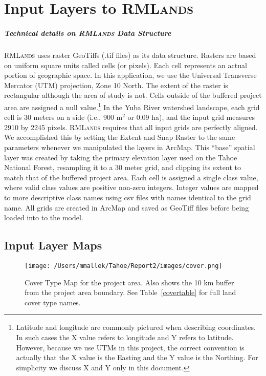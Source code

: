 \appendix


\chapter{Input Layers to \textsc{RMLands}}
\label{app:inputs}

\paragraph{Technical details on \textsc{RMLands} Data Structure}
\label{app:rmlspecs}
\textsc{RMLands} uses raster GeoTiffs (.tif files) as its data structure. Rasters are based on uniform square units called cells (or pixels). Each cell represents an actual portion of geographic space. In this application, we use the Universal Transverse Mercator (UTM) projection, Zone 10 North. The extent of the raster is rectangular although the area of study is not. Cells outside of the buffered project area are assigned a null value.\footnote{Latitude and longitude are commonly pictured when describing coordinates. In such cases the X value refers to longitude and Y refers to latitude. However, because we use UTMs in this project, the correct convention is actually that the X value is the Easting and the Y value is the Northing. For simplicity we discuss X and Y only in this document.} In the Yuba River watershed landscape, each grid cell is 30 meters on a side (i.e., 900 m$^2$ or 0.09 ha), and the input grid measures 2910 by 2245 pixels. \textsc{RMLands} requires that all input grids are perfectly aligned. We accomplished this by setting the Extent and Snap Raster to the same parameters whenever we manipulated the layers in ArcMap. This ``base'' spatial layer was created by taking the primary elevation layer used on the Tahoe National Forest, resampling it to a 30 meter grid, and clipping its extent to match that of the buffered project area. Each cell is assigned a single class value, where valid class values are positive non-zero integers. Integer values are mapped to more descriptive class names using csv files with names identical to the grid name. All grids are created in ArcMap and saved as GeoTiff files before being loaded into to the model. 

\section{Input Layer Maps}
\label{app:sec:inputmaps}

\begin{figure}[!htbp]
\centering
\texttt{[image: /Users/mmallek/Tahoe/Report2/images/cover.png]}
\caption{Cover Type Map for the project area. Also shows the 10 km buffer from the project area boundary. See Table~\ref{covertable} for full land cover type names.}
\end{figure}

